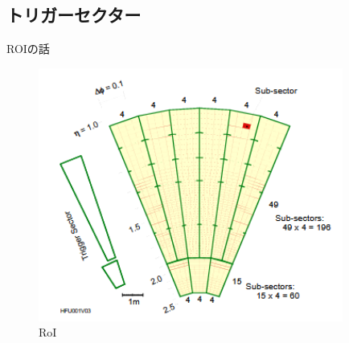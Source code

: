 \subsection{トリガーセクター}
ROIの話
\begin{figure}[tb]
  \centering
  \includegraphics[clip, width=10cm]{fig/3/RoI.png}
  \caption{RoI}
  \label{fig:RoI}
\end{figure}


